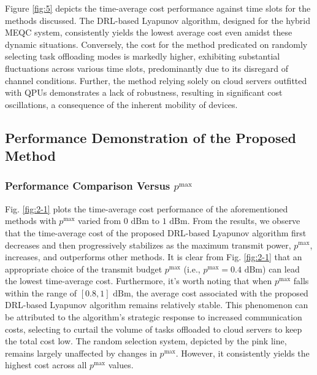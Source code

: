 \documentclass[journal]{IEEEtran}
\begin{document}
Figure \ref{fig:5} depicts the time-average cost performance against time slots for the methods discussed.
The DRL-based Lyapunov algorithm, designed for the hybrid MEQC system, consistently yields the lowest average cost even amidst these dynamic situations.
Conversely, the cost for the method predicated on randomly selecting task offloading modes is markedly higher, exhibiting
substantial fluctuations across various time slots, predominantly due to its disregard of channel conditions.
Further, the method relying solely on cloud servers outfitted  with QPUs demonstrates a lack of robustness, resulting in significant cost oscillations, a consequence of the inherent mobility of devices.

\subsection{Performance Demonstration of the Proposed Method}
\subsubsection{Performance Comparison Versus $p^{\max}$}
Fig. \ref{fig:2-1} plots the time-average cost performance of the aforementioned methods with $p^{\max}$ varied from $0\text{~dBm}$ to $1\text{~dBm}$.
From the results, we observe that the time-average cost of the proposed DRL-based Lyapunov algorithm first decreases and then progressively stabilizes as the maximum transmit power, $p^{\max}$, increases, and outperforms other methods.
It is clear from Fig. \ref{fig:2-1} that an appropriate choice of the transmit budget $p^{\max}$ (i.e.,  $p^{\max}=0.4\text{~dBm}$) can lead the lowest time-average cost.
Furthermore, it's worth noting that when $p^{\max}$ falls within the range of $[0.8, 1]\text{~dBm}$, the average cost associated with the proposed DRL-based Lyapunov algorithm remains relatively stable.
This phenomenon can be attributed to the algorithm's strategic response to increased communication costs, selecting to curtail the volume of tasks offloaded to cloud servers to keep the total cost low.
The random selection system, depicted by the pink line, remains largely unaffected by changes in $p^{\max}$.
However, it consistently yields the highest cost across all $p^{\max}$ values.
\end{document}
